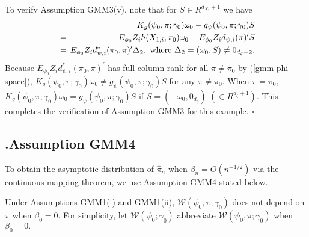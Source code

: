 \documentclass[12pt,thmsb,titlepage,final,oneside,letterpaper]{article}
\begin{document}
To verify Assumption GMM3(v), note that for $S\in R^{d_{X_{2}}+1}$ we have%
\begin{eqnarray}
&&K_{g}(\psi _{0},\pi ;\gamma _{0})\omega _{0}-g_{\psi }(\psi _{0},\pi
;\gamma _{0})S  \notag \\
\hspace{-0.08in} &=&\hspace{-0.08in}E_{\phi _{0}}Z_{i}h(X_{1,i},\pi
_{0})\omega _{0}+E_{\phi _{0}}Z_{i}d_{\psi ,i}(\pi )^{\prime }S  \notag \\
\hspace{-0.08in} &=&\hspace{-0.08in}E_{\phi _{0}}Z_{i}d_{\psi ,i}^{\ast
}(\pi _{0},\pi )^{\prime }\Delta _{2},\text{ where }\Delta _{2}=(\omega
_{0},S)\neq 0_{d_{\zeta }+2}.
\end{eqnarray}%
Because $E_{\phi _{0}}Z_{i}d_{\psi ,i}^{\ast }(\pi _{0},\pi )^{\prime }$ has
full column rank for all $\pi \neq \pi _{0}$ by (\ref{gmm phi space}), $%
K_{g}(\psi _{0},\pi ;\gamma _{0})\omega _{0}\neq g_{\psi }(\psi _{0},\pi
;\gamma _{0})S$ for any $\pi \neq \pi _{0}.$ When $\pi =\pi _{0},$ $%
K_{g}(\psi _{0},\pi ;\gamma _{0})\omega _{0}=g_{\psi }(\psi _{0},\pi ;\gamma
_{0})S$ if $S=(-\omega _{0},0_{d_{\zeta }})$ $(\in R^{d_{\zeta }+1}).$ This
completes the verification of Assumption GMM3 for this example. $\square $

\subsection{\hspace{-0.23in}\textbf{.}\hspace{0.18in}Assumption GMM4}

\hspace{0.25in}To obtain the asymptotic distribution of $\widehat{\pi }_{n}$
when $\beta _{n}=O(n^{-1/2})$ via the continuous mapping theorem, we use
Assumption GMM4 stated below.

Under Assumptions GMM1(i) and GMM1(ii), $\mathcal{W}(\psi _{0},\pi ;\gamma
_{0})$ does not depend on $\pi $ when $\beta _{0}=0.$ For simplicity, let $%
\mathcal{W}(\psi _{0};\gamma _{0})$ abbreviate $\mathcal{W}(\psi _{0},\pi
;\gamma _{0})$ when $\beta _{0}=0.$
\end{document}
